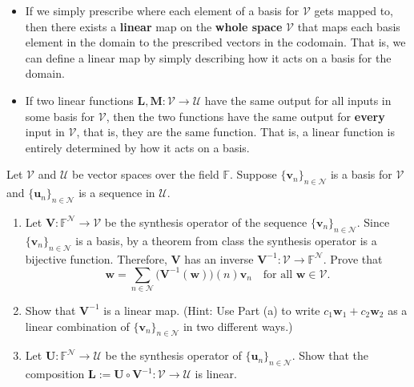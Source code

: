 \documentclass[12pt]{amsart}
\newcommand{\1}{\mathbbm{1}}
\numberwithin{equation}{section}
\numberwithin{Theorem}{section}
\theoremstyle{plain} %
\theoremstyle{definition}
\theoremstyle{remark}
\begin{document}
\begin{enumerate}[1.]
\begin{itemize}
\item If we simply prescribe where each element of a basis for \(\mathcal{V}\) gets mapped to, then there exists a \textbf{linear} map on the \textbf{whole space} \(\mathcal{V}\) that maps each basis element in the domain to the prescribed vectors in the codomain. That is, we can define a linear map by simply describing how it acts on a basis for the domain.

\item If two linear functions \(\mathbf{L},\mathbf{M}:\mathcal{V}\to\mathcal{U}\) have the same output for all inputs in some basis for \(\mathcal{V}\), then the two functions have the same output for \textbf{every} input in \(\mathcal{V}\), that is, they are the same function. That is, a linear function is entirely determined by how it acts on a basis.
\end{itemize}

Let \(\mathcal{V}\) and \(\mathcal{U}\) be vector spaces over the field \(\mathbb{F}\). Suppose \(\{\mathbf{v}_{n}\}_{n\in\mathcal{N}}\) is a basis for \(\mathcal{V}\) and \(\{\mathbf{u}_{n}\}_{n\in\mathcal{N}}\) is a sequence in \(\mathcal{U}\). 




\bigskip

\begin{enumerate}

\item Let \(\mathbf{V}:\mathbb{F}^{\mathcal{N}}\to\mathcal{V}\) be the synthesis operator of the sequence \(\{\mathbf{v}_{n}\}_{n\in\mathcal{N}}\). Since \(\{\mathbf{v}_{n}\}_{n\in\mathcal{N}}\) is a basis, by a theorem from class the synthesis operator is a bijective function. Therefore, \(\mathbf{V}\) has an inverse \(\mathbf{V}^{-1}:\mathcal{V}\to\mathbb{F}^{\mathcal{N}}\). Prove that
\[\mathbf{w} = \sum_{n\in\mathcal{N}}\big(\mathbf{V}^{-1}(\mathbf{w})\big)(n)\mathbf{v}_{n}\quad\text{for all }\mathbf{w}\in\mathcal{V}.\]

\bigskip


\item Show that \(\mathbf{V}^{-1}\) is a linear map. (Hint: Use Part (a) to write \(c_{1}\mathbf{w}_{1} + c_{2}\mathbf{w}_{2}\) as a linear combination of \(\{\mathbf{v}_{n}\}_{n\in\mathcal{N}}\) in two different ways.)

\bigskip

\item Let \(\mathbf{U}:\mathbb{F}^{\mathcal{N}}\to\mathcal{U}\) be the synthesis operator of \(\{\mathbf{u}_{n}\}_{n\in\mathcal{N}}\). Show that the composition \(\mathbf{L}:=\mathbf{U}\circ\mathbf{V}^{-1}:\mathcal{V}\to\mathcal{U}\) is linear.


\end{enumerate}
\end{enumerate}
\end{document}
